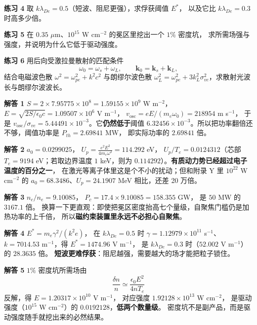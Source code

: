 \textbf{练习 4} 取 $k\lambda_{De} = 0.5$（短波、阻尼更强），求俘获阈值 $E^{*}$，
以及它比 $k\lambda_{De} = 0.3$ 时高多少倍。

\textbf{练习 5} 在 $0.35$ $\mu$m、$10^{15}$ W cm$^{-2}$ 的冕区里挖出一个 $1\%$ 密度坑，
求所需场强与强度，并说明为什么它低于驱动强度。

\textbf{练习 6} 用后向受激拉曼散射的匹配条件
\begin{equation}
\omega_0 = \omega_s + \omega_L , \qquad
\mathbf{k}_0 = \mathbf{k}_s + \mathbf{k}_L ,
\label{eq:app-al-ex-srs}
\end{equation}
结合电磁波色散 $\omega^2 = \omega_{pe}^2 + k^2c^2$ 与朗缪尔波色散
$\omega_L^2 = \omega_{pe}^2 + 3k_L^2\sigma_{ve}^2$，求散射光波长与朗缪尔波波长。

\textbf{解答 1} $S = 2\times7.95775\times10^{8} = 1.59155\times10^{9}$ W m$^{-2}$，
$E = \sqrt{2S/\epsilon_0c} = 1.09507\times10^{6}$ V m$^{-1}$，
$v_{\mathrm{osc}} = eE/(m_e\omega_0) = 218954$ m s$^{-1}$，
于是 $v_{\mathrm{osc}}/\sigma_{ve} = 5.44491\times10^{-3}$。它\textbf{仍然低于}阈值
$6.32456\times10^{-3}$。所以把功率翻倍还不够，阈值功率是 $P_{th} = 2.69841$ MW，
即实际功率的 $2.69841$ 倍。

\textbf{解答 2} $a_0 = 0.0299025$，
$U_p = \frac{e^2E^2}{4m_e\omega^2} = 114.292$ eV，
$U_p/T_e = 0.0124312$（芯部 $T_e = 9194$ eV；若取边界温度 $1$ keV，则为 $0.114292$）。\textbf{有质动力势已经超过电子温度的百分之一}，
在激光等离子体里这是个不小的扰动；但和附录 Y 里 $10^{22}$ W cm$^{-2}$ 的
$a_0 = 68.3486$、$U_p = 24.1907$ MeV 相比，还差 20 万倍。

\textbf{解答 3} $n_c/n_e = 9.10085$，
$P_c = 17.4\times9.10085 = 158.355$ GW，
是 $50$ MW 的 $3167.1$ 倍。
换算一下更直观：即使把冕区密度抬高七个量级，自聚焦门槛仍是加热功率的上千倍，
所以\textbf{磁约束装置里永远不必担心自聚焦}。

\textbf{解答 4} $E^{*} = m_e\gamma^2/(k^2e)$，
在 $k\lambda_{De} = 0.5$ 时 $\gamma = 1.12979\times10^{11}$ s$^{-1}$、
$k = 7014.53$ m$^{-1}$，得 $E^{*} = 1474.96$ V m$^{-1}$，
是 $k\lambda_{De} = 0.3$ 时（$52.002$ V m$^{-1}$）的 $28.3635$ 倍。
\textbf{短波更难俘获}：阻尼越强，需要越大的场才能把粒子锁住。

\textbf{解答 5} $1\%$ 密度坑所需场由
\begin{equation}
\frac{\delta n}{n} \simeq \frac{\epsilon_0E^2}{4nT_e}
\label{eq:app-al-ex-dent}
\end{equation}
反解，得 $E = 1.20317\times10^{10}$ V m$^{-1}$，
对应强度 $1.92128\times10^{13}$ W cm$^{-2}$，
是驱动强度（$10^{15}$ W cm$^{-2}$）的 $0.0192128$，\textbf{低两个数量级}。
密度坑不是副产品，而是驱动强度随手就挖出来的必然结果。

